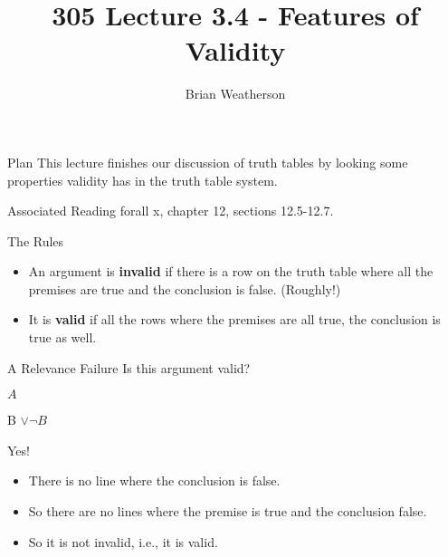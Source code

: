 \documentclass[
  ignorenonframetext,
]{beamer}
\title{305 Lecture 3.4 - Features of Validity}
\author{Brian Weatherson}
\date{}
\providecommand{\tightlist}{%
  \setlength{\itemsep}{0pt}\setlength{\parskip}{0pt}}
\renewcommand{\,}{\text{, }}
\begin{document}
\frame{\titlepage}

\begin{frame}{Plan}
\protect\hypertarget{plan}{}
This lecture finishes our discussion of truth tables by looking some
properties validity has in the truth table system.
\end{frame}

\begin{frame}{Associated Reading}
\protect\hypertarget{associated-reading}{}
forall x, chapter 12, sections 12.5-12.7.
\end{frame}

\begin{frame}{The Rules}
\protect\hypertarget{the-rules}{}
\begin{itemize}
\tightlist
\item
  An argument is \textbf{invalid} if there is a row on the truth table
  where all the premises are true and the conclusion is false.
  (Roughly!)
\item
  It is \textbf{valid} if all the rows where the premises are all true,
  the conclusion is true as well.
\end{itemize}
\end{frame}

\begin{frame}{A Relevance Failure}
\protect\hypertarget{a-relevance-failure}{}
Is this argument valid?

\begin{description}
\tightlist
\item[~]
\(A\)
\item[\(\therefore\)]
B \(\vee \neg B\)
\end{description}

\pause

Yes!

\begin{itemize}
\tightlist
\item
  There is no line where the conclusion is false.
\item
  So there are no lines where the premise is true and the conclusion
  false.
\item
  So it is not invalid, i.e., it is valid.
\end{itemize}
\end{frame}
\end{document}
